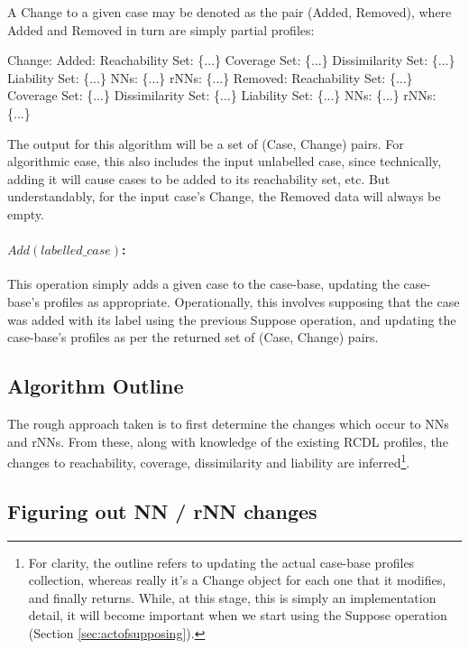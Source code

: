 \documentclass[a4paper,11pt]{report}
\begin{document}
A Change to a given case may be denoted as the pair (Added, Removed), where Added and Removed in turn are simply partial profiles:
\begin{code}[numbers=none,frame=none]
Change:
  Added:
    Reachability Set:  \{...\}
    Coverage Set:      \{...\}
    Dissimilarity Set: \{...\}
    Liability Set:     \{...\}
    NNs:               \{...\}
    rNNs:              \{...\}
  Removed:
    Reachability Set:  \{...\}
    Coverage Set:      \{...\}
    Dissimilarity Set: \{...\}
    Liability Set:     \{...\}
    NNs:               \{...\}
    rNNs:              \{...\}
\end{code}

The output for this algorithm will be a set of (Case, Change) pairs. For algorithmic ease, this also includes the input unlabelled case, since technically, adding it will cause cases to be added to its reachability set, etc. But understandably, for the input case's Change, the Removed data will always be empty.

\paragraph{$Add(labelled\_case)$:}
This operation simply adds a given case to the case-base, updating the case-base's profiles as appropriate. Operationally, this involves supposing that the case was added with its label using the previous Suppose operation, and updating the case-base's profiles as per the returned set of (Case, Change) pairs.


\subsection{Algorithm Outline}
The rough approach taken is to first determine the changes which occur to NNs and rNNs. From these, along with knowledge of the existing RCDL profiles, the changes to reachability, coverage, dissimilarity and liability are inferred\footnote{For clarity, the outline refers to updating the actual case-base profiles collection, whereas really it's a Change object for each one that it modifies, and finally returns. While, at this stage, this is simply an implementation detail, it will become important when we start using the Suppose operation (Section \ref{sec:actofsupposing}).}.

\subsection{Figuring out NN / rNN changes}
\end{document}
